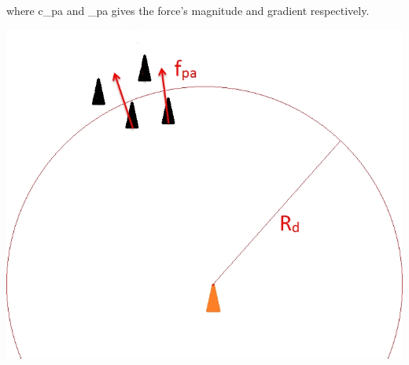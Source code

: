 \documentclass[12pt]{article}
\begin{document}
where c_{pa} and \omega _{pa} gives the force's magnitude and gradient respectively.
\begin{center}
\includegraphics[scale=0.4]{fig3.png} 
\end{center}

\pagebreak
\end{document}
